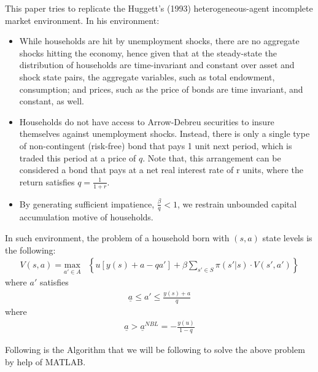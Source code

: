 \documentclass[a4paper,10pt,12pt]{article}%
\begin{document}
 This paper tries to replicate the Huggett's (1993) heterogeneous-agent incomplete market environment. In his environment:
 \begin{itemize} 
\item While households are hit by unemployment shocks, there are no aggregate shocks hitting the economy, hence given that at the steady-state the distribution of households are time-invariant and constant over asset and shock state pairs, the aggregate variables, such as total endowment, consumption; and prices, such as the price of bonds are time invariant, and constant, as well. 
\item Households do not have access to Arrow-Debreu securities to insure themselves against unemployment shocks. Instead, there is only a single type of non-contingent (risk-free) bond that pays 1 unit next period, which is traded this period at a price of $q$. Note that, this arrangement can be considered a bond that pays at a net real interest rate of r units, where the return satisfies $q=\frac{1}{1+r}$.
\item By generating sufficient impatience, $\frac{\beta}{q}<1$, we restrain unbounded capital accumulation motive of households.
\end{itemize}
In such environment, the problem of a household born with $(s,a)$ state levels is the following:
\begin{align*}
V(s,a) =  \underset{ a' \in A }{\text{max}}
 & \left\lbrace u\left[ y(s) + a - qa' \right] + \beta \sum_{s' \in S} \pi(s'|s) \cdot V(s',a')  \right\rbrace
\end{align*}
where $a'$ satisfies 
\begin{align*}
\underline{a} \leq a' \leq \frac{y(s)+a}{q}
\end{align*}
where
\begin{align*}
\underline{a} > \underline{a}^{NBL} = - \frac{y(u)}{1-q}
\end{align*}

Following is the Algorithm that we will be following to solve the above problem by help of MATLAB.
\end{document}
